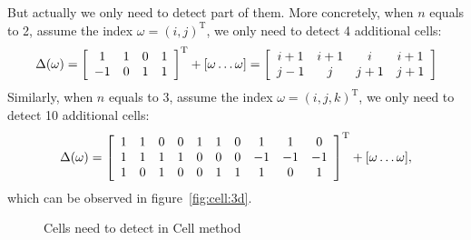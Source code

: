 \documentclass[prodmode,acmtecs]{acmsmall} %
\begin{document}
But actually we only need to detect part of them. More concretely, when $n$ equals to 2, assume the index $\omega = (i,j)^\mathrm{T}$, we only need to detect 4 additional cells:
\begin{equation}\centering
\Delta(\omega) = 
\left[
    \begin{array}{c c c c}
    1 & 1 & 0 & 1 \\
    -1 & 0 & 1 & 1 \\
    \end{array}
\right]^\mathrm{T}+[\omega \dots \omega] = 
\left[
    \begin{array}{c c c c}
        i+1 & i+1 & i & i+1 \\
        j-1 & j & j+1 & j+1\\
    \end{array}
\right]
\end{equation}
Similarly, when $n$ equals to 3, assume the index $\omega = (i,j, k)^\mathrm{T}$, we only need to detect 10 additional cells:
\begin{equation}
\Delta(\omega) = 
\left[
    \begin{array}{c c c c c c c c c c}
        1 & 1 & 0 & 0 & 1 & 1 & 0 & 1 & 1 & 0 \\
        1 & 1 & 1 & 1 & 0 & 0 & 0 & -1 & -1 & -1 \\
        1 & 0 & 1 & 0 & 0 & 1 & 1 & 1 & 0 & 1 \\
    \end{array}
\right]^\mathrm{T}+[\omega \dots \omega],
\end{equation}
which can be observed in figure~\ref{fig:cell:3d}.
\begin{figure}
\label{fig:cell}
\centerline{
\hspace{1in}
}
\caption{Cells need to detect in Cell method}
\end{figure}
\end{document}
